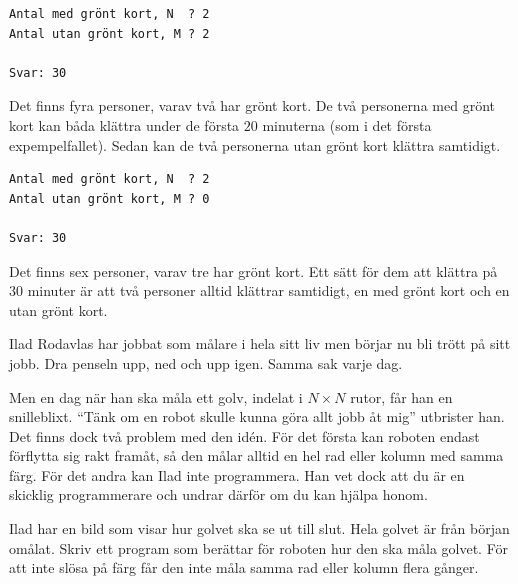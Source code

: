 \vspace{0.5cm}

\begin{verbatim}
Antal med grönt kort, N  ? 2
Antal utan grönt kort, M ? 2

Svar: 30
\end{verbatim}

 Det finns fyra personer, varav två har grönt kort.
De två personerna med grönt kort kan båda klättra under de första $20$ minuterna (som i det första expempelfallet).
Sedan kan de två personerna utan grönt kort klättra samtidigt.

\vspace{0.5cm}

\begin{verbatim}
Antal med grönt kort, N  ? 2
Antal utan grönt kort, M ? 0

Svar: 30
\end{verbatim}

 Det finns sex personer, varav tre har grönt kort.
Ett sätt för dem att klättra på $30$ minuter är att två personer alltid klättrar samtidigt, en med grönt kort och en utan grönt kort.


\newpage
{}

Ilad Rodavlas har jobbat som målare i hela sitt liv men börjar nu bli trött på sitt jobb.
Dra penseln upp, ned och upp igen.
Samma sak varje dag.

Men en dag när han ska måla ett golv, indelat i $N \times N$ rutor, får han en snilleblixt.
``Tänk om en robot skulle kunna göra allt jobb åt mig'' utbrister han.
Det finns dock två problem med den  idén.
För det första kan roboten endast förflytta sig rakt framåt, så den målar alltid en hel rad eller kolumn med samma färg.
För det andra kan Ilad inte programmera.
Han vet dock att du är en skicklig programmerare och undrar därför om du kan hjälpa honom. 

Ilad har en bild som visar hur golvet ska se ut till slut. Hela golvet är från början omålat.
Skriv ett program som berättar för roboten hur den ska måla golvet.
För att inte slösa på färg får den inte måla samma rad eller kolumn flera gånger.


